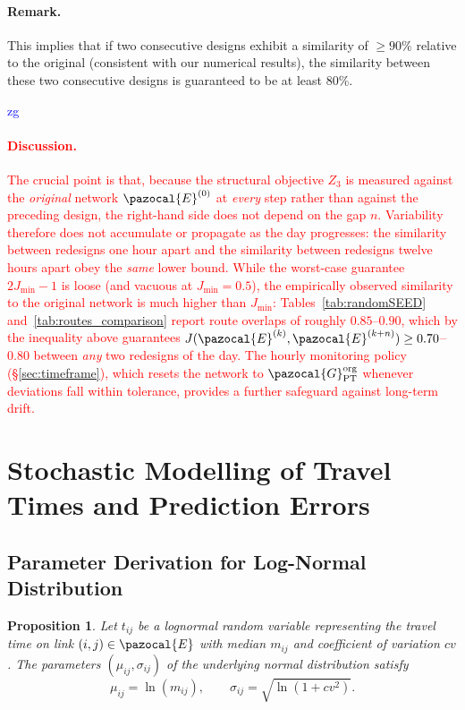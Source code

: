 \documentclass[a4paper,fleqn]{cas-sc}
\newtheorem{proposition}{Proposition}
\newcommand{\stkout}[1]{\ifmmode\text{\sout{\ensuremath{#1}}}\else\sout{#1}\fi}
\newcommand\rev[3]{\textcolor{blue}{\begin{scriptsize}{#1}\end{scriptsize}\stkout{#2}}\textcolor{red}{#3}}
\newcommand\rev[3]{\ignorespaces#3\ignorespaces\unskip}
\begin{document}
\paragraph{Remark.}
This implies that if two consecutive designs exhibit a similarity of $\geq 90\%$ relative to the original (consistent with our numerical results), the similarity between these two consecutive designs is guaranteed to be at least 80\%.

\rev{zg}{}{\paragraph{Discussion.}
The crucial point is that, because the structural objective $Z_3$ is measured against the \emph{original} network $\pazocal{E}^{(0)}$ at \emph{every} step rather than against the preceding design, the right-hand side does not depend on the gap $n$. Variability therefore does not accumulate or propagate as the day progresses: the similarity between redesigns one hour apart and the similarity between redesigns twelve hours apart obey the \emph{same} lower bound. While the worst-case guarantee $2J_{\min}-1$ is loose (and vacuous at $J_{\min}=0.5$), the empirically observed similarity to the original network is much higher than $J_{\min}$: Tables~\ref{tab:randomSEED} and~\ref{tab:routes_comparison} report route overlaps of roughly $0.85$--$0.90$, which by the inequality above guarantees $J(\pazocal{E}^{(k)},\pazocal{E}^{(k+n)}) \ge 0.70$--$0.80$ between \emph{any} two redesigns of the day. The hourly monitoring policy (\S\ref{sec:timeframe}), which resets the network to $\pazocal{G}_\text{PT}^\text{org}$ whenever deviations fall within tolerance, provides a further safeguard against long-term drift.}
\section{Stochastic Modelling of Travel Times and Prediction Errors}

\subsection{Parameter Derivation for Log-Normal Distribution}\label{Appendix:log_normal}

\begin{proposition}
\label{prop:lognormal}
Let $t_{ij}$ be a lognormal random variable representing the travel time on link $(i,j)\in\pazocal{E}$ with median $m_{ij}$ and coefficient of 
variation $cv$. The parameters $(\mu_{ij},\sigma_{ij})$ of the underlying normal 
distribution satisfy
\[
    \mu_{ij} = \ln(m_{ij}), 
    \qquad
    \sigma_{ij} = \sqrt{\ln(1 + cv^{2})}.
\]
\end{proposition}
\end{document}
